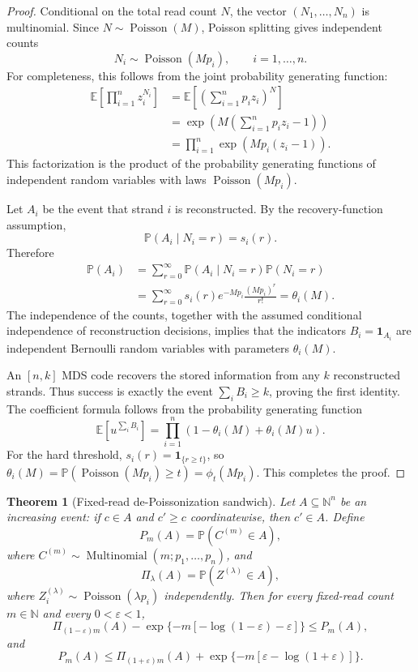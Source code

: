 \documentclass[11pt]{article}
\newtheorem{theorem}{Theorem}
\theoremstyle{definition}
\theoremstyle{remark}
\DeclareMathOperator{\Poisson}{Poisson}
\DeclareMathOperator{\Multinomial}{Multinomial}
\newcommand{\E}{\mathbb E}
\newcommand{\Pbb}{\mathbb P}
\newcommand{\N}{\mathbb N}
\newcommand{\1}{\mathbf 1}
\begin{document}
\begin{proof}
Conditional on the total read count \(N\), the vector \((N_1,\ldots,N_n)\) is multinomial.  Since \(N\sim\Poisson(M)\), Poisson splitting gives independent counts
\[
  N_i\sim\Poisson(Mp_i),\qquad i=1,\ldots,n.
\]
For completeness, this follows from the joint probability generating function:
\[
\begin{aligned}
  \E\left[\prod_{i=1}^n z_i^{N_i}\right]
  &=\E\left[\left(\sum_{i=1}^n p_i z_i\right)^N\right]  \\
  &=\exp\left(M\left(\sum_{i=1}^n p_i z_i-1\right)\right)  \\
  &=\prod_{i=1}^n \exp\left(Mp_i(z_i-1)\right).
\end{aligned}
\]
This factorization is the product of the probability generating functions of independent random variables with laws \(\Poisson(Mp_i)\).

Let \(A_i\) be the event that strand \(i\) is reconstructed.  By the recovery-function assumption,
\[
  \Pbb(A_i\mid N_i=r)=s_i(r).
\]
Therefore
\[
\begin{aligned}
  \Pbb(A_i)
  &=\sum_{r=0}^{\infty}\Pbb(A_i\mid N_i=r)\Pbb(N_i=r) \\
  &=\sum_{r=0}^{\infty}s_i(r)e^{-Mp_i}\frac{(Mp_i)^r}{r!}
  =\theta_i(M).
\end{aligned}
\]
The independence of the counts, together with the assumed conditional independence of reconstruction decisions, implies that the indicators \(B_i=\1_{A_i}\) are independent Bernoulli random variables with parameters \(\theta_i(M)\).

An \([n,k]\) MDS code recovers the stored information from any \(k\) reconstructed strands.  Thus success is exactly the event \(\sum_i B_i\ge k\), proving the first identity.  The coefficient formula follows from the probability generating function
\[
  \E\left[u^{\sum_i B_i}\right]
  =\prod_{i=1}^n(1-\theta_i(M)+\theta_i(M)u).
\]
For the hard threshold, \(s_i(r)=\1_{\{r\ge t\}}\), so \(\theta_i(M)=\Pbb(\Poisson(Mp_i)\ge t)=\phi_t(Mp_i)\).  This completes the proof.
\end{proof}

\begin{theorem}[Fixed-read de-Poissonization sandwich]\label{thm:depoissonization}
Let \(A\subseteq\N^n\) be an increasing event: if \(c\in A\) and \(c'\ge c\) coordinatewise, then \(c'\in A\).  Define
\[
  P_m(A)=\Pbb(C^{(m)}\in A),
\]
where \(C^{(m)}\sim\Multinomial(m;p_1,\ldots,p_n)\), and
\[
  \Pi_\lambda(A)=\Pbb(Z^{(\lambda)}\in A),
\]
where \(Z_i^{(\lambda)}\sim\Poisson(\lambda p_i)\) independently.  Then for every fixed-read count \(m\in\N\) and every \(0<\varepsilon<1\),
\[
  \Pi_{(1-\varepsilon)m}(A)
  -\exp\{-m[-\log(1-\varepsilon)-\varepsilon]\}
  \le P_m(A),
\]
and
\[
  P_m(A)
  \le \Pi_{(1+\varepsilon)m}(A)
  +\exp\{-m[\varepsilon-\log(1+\varepsilon)]\}.
\]
\end{theorem}
\end{document}
